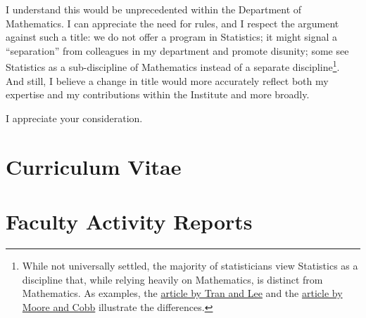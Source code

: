 \documentclass[
  letterpaper,
  DIV=11,
  numbers=noendperiod]{scrreprt}
\begin{document}
I understand this would be unprecedented within the Department of
Mathematics. I can appreciate the need for rules, and I respect the
argument against such a title: we do not offer a program in Statistics;
it might signal a ``separation'' from colleagues in my department and
promote disunity; some see Statistics as a sub-discipline of Mathematics
instead of a separate discipline\footnote{While not universally settled,
  the majority of statisticians view Statistics as a discipline that,
  while relying heavily on Mathematics, is distinct from Mathematics. As
  examples, the
  \href{https://fi-courses.s3.amazonaws.com/tsdi/unit_2/Essentials/Statvsmath.pdf}{article
  by Tran and Lee} and the
  \href{https://www.stat.purdue.edu/~dsmoore/articles/Statmath.pdf}{article
  by Moore and Cobb} illustrate the differences.}. And still, I believe
a change in title would more accurately reflect both my expertise and my
contributions within the Institute and more broadly.

I appreciate your consideration.

\cleardoublepage
{}
{}
\appendix

\chapter{Curriculum Vitae}\label{curriculum-vitae}




\chapter{Faculty Activity Reports}\label{faculty-activity-reports}









\end{document}
